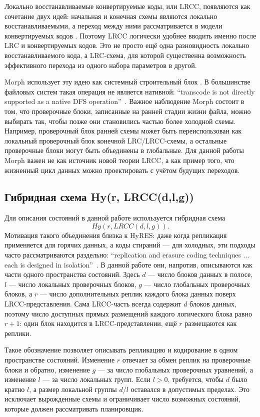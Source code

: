 Локально восстанавливаемые конвертируемые коды, или LRCC, появляются как
сочетание двух идей: начальная и конечная схемы являются локально
восстанавливаемыми, а переход между ними рассматривается в модели
конвертируемых кодов \cite{kong2024lrcconvertible}. Поэтому LRCC логически
удобнее вводить именно после LRC и конвертируемых кодов. Это не просто ещё
одна разновидность локально восстанавливаемого кода, а LRC-схема, для которой
существенна возможность эффективного перехода из одного набора параметров в
другой.

Morph использует эту идею как системный строительный блок
\cite{kim2024morph}. В большинстве файловых систем такая операция не является
нативной: \enquote{transcode is not directly supported as a native DFS
operation}~\cite{kim2024morph}. Важное наблюдение Morph состоит в том, что проверочные
блоки, записанные на ранней стадии жизни файла, можно выбирать так, чтобы
позже они становились частью более холодной схемы. Например, проверочный
блок ранней схемы может быть переиспользован как локальный проверочный
блок конечной LRC/LRCC-схемы, а остальные проверочные блоки могут быть
объединены в глобальные. Для данной работы Morph важен не как источник новой
теории LRCC, а как пример того, что жизненный цикл данных можно проектировать
с учётом будущих переходов.

\subsection{Гибридная схема Hy(r, LRCC(d,l,g))}
\label{sec:theory-hybrid}

Для описания состояний в данной работе используется гибридная схема
\[
    Hy(r, LRCC(d,l,g)).
\]
Мотивация такого объединения близка к HyRES: даже когда репликация применяется
для горячих данных, а коды стираний --- для холодных, эти подходы часто
рассматриваются раздельно: \enquote{replication and erasure coding techniques
... each is designed in isolation}~\cite{lucani2025hyres}. В данной работе они, напротив, описываются как части
одного пространства состояний.
Здесь \(d\) --- число блоков данных в полосе, \(l\) --- число локальных
проверочных блоков, \(g\) --- число глобальных проверочных блоков, а
\(r\) --- число дополнительных реплик каждого блока данных поверх
LRCC-представления. Сама LRCC-часть всегда содержит \(d\) блоков данных,
поэтому число доступных прямых размещений каждого логического блока равно
\(r+1\): один блок находится в LRCC-представлении, ещё \(r\) размещаются как
реплики.

Такое обозначение позволяет описывать репликацию и кодирование в одном
пространстве состояний. Изменение \(r\) отвечает за обмен реплик на
проверочные блоки и обратно, изменение \(g\) --- за число глобальных
проверочных уравнений, а изменение \(l\) --- за число локальных групп. Если
\(l>0\), требуется, чтобы \(d\) было кратно \(l\), а размер локальной группы
\(d/l\) оставался в допустимых пределах. Это исключает вырожденные схемы и
ограничивает число возможных состояний, которые должен рассматривать
планировщик.

